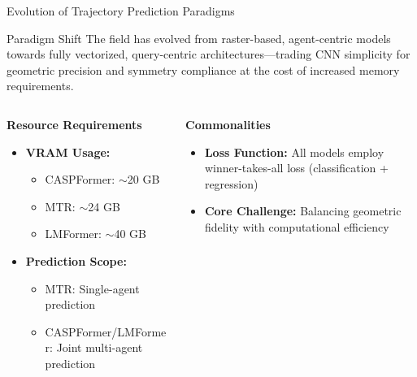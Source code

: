 \documentclass[10pt,aspectratio=169]{beamer}
\begin{document}
\begin{frame}{Evolution of Trajectory Prediction Paradigms}
    \begin{block}{Paradigm Shift}
        The field has evolved from raster-based, agent-centric models towards fully vectorized, query-centric architectures—trading CNN simplicity for geometric precision and symmetry compliance at the cost of increased memory requirements.
    \end{block}

    \begin{columns}[T]
        \begin{column}{0.48\textwidth}
            \textbf{Resource Requirements}
            \begin{itemize}
                \item \textbf{VRAM Usage:}
                \begin{itemize}
                    \item CASPFormer: $\sim$20 GB
                    \item MTR: $\sim$24 GB
                    \item LMFormer: $\sim$40 GB
                \end{itemize}
                \item \textbf{Prediction Scope:}
                \begin{itemize}
                    \item MTR: Single-agent prediction
                    \item CASPFormer/LMFormer: Joint multi-agent prediction
                \end{itemize}
            \end{itemize}
        \end{column}
        \begin{column}{0.48\textwidth}
            \textbf{Commonalities}
            \begin{itemize}
                \item \textbf{Loss Function:} All models employ winner-takes-all loss (classification + regression)
                \item \textbf{Core Challenge:} Balancing geometric fidelity with computational efficiency
            \end{itemize}
        \end{column}
    \end{columns}
\end{frame}

\end{document}

